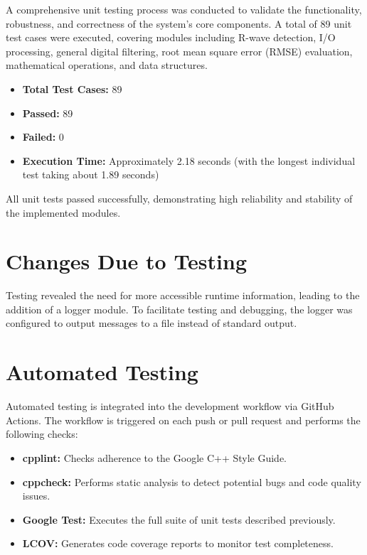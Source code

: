 \documentclass[12pt, titlepage]{article}
\begin{document}
A comprehensive unit testing process was conducted to validate the
functionality, robustness, and correctness of the system's core components. A
total of 89 unit test cases were executed, covering modules including R-wave
detection, I/O processing, general digital filtering, root mean square error
(RMSE) evaluation, mathematical operations, and data structures.

\begin{itemize}
    \item \textbf{Total Test Cases:} 89
    \item \textbf{Passed:} 89
    \item \textbf{Failed:} 0
    \item \textbf{Execution Time:} Approximately 2.18 seconds (with the longest
    individual test taking about 1.89 seconds)
\end{itemize}

All unit tests passed successfully, demonstrating high reliability and stability
of the implemented modules.

\section{Changes Due to Testing}

Testing revealed the need for more accessible runtime information, leading to
the addition of a logger module. To facilitate testing and debugging, the logger
was configured to output messages to a file instead of standard output.

\section{Automated Testing}

Automated testing is integrated into the development workflow via GitHub
Actions. The workflow is triggered on each push or pull request and performs the
following checks:

\begin{itemize}
    \item \textbf{cpplint:} Checks adherence to the Google C++ Style Guide.
    \item \textbf{cppcheck:} Performs static analysis to detect potential bugs
    and code quality issues.
    \item \textbf{Google Test:} Executes the full suite of unit tests described
    previously.
    \item \textbf{LCOV:} Generates code coverage reports to monitor test
    completeness.
\end{itemize}
\end{document}
